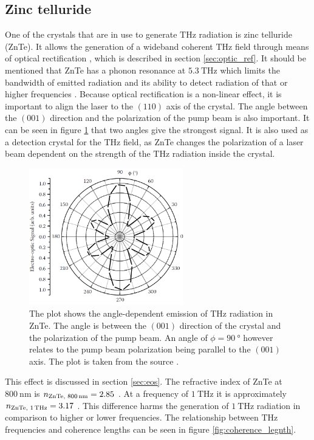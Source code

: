 \subsection{Zinc telluride}
\label{sec:znte}
One of the crystals that are in use to generate $\si{\tera\hertz}$ radiation is zinc telluride (ZnTe). 
It allows the generation of a wideband coherent $\si{\tera\hertz}$ field through means of optical rectification \cite{ZnTe_Nahata_Weling_1996}, which is described in section \ref{sec:optic_ref}.
It should be mentioned that ZnTe has a phonon resonance at $\SI{5.3}{\tera\hertz}$ which limits the bandwidth of emitted radiation and its ability to detect radiation of that or higher frequencies \cite{phonon_modes}\cite{phonon_ZnTe}.
Because optical rectification is a non-linear effect, it is important to align the laser to the $(110)$ axis of the crystal.
The angle between the $(001)$ direction and the polarization of the pump beam is also important.
It can be seen in figure \ref{fig:polarization_dependence_angle} that two angles give the strongest signal.
It is also used as a detection crystal for the $\si{\tera\hertz}$ field, as ZnTe changes the polarization of a laser beam dependent on the strength of the $\si{\tera\hertz}$ radiation inside the crystal.\FloatBarrier
\begin{figure}
    \centering
    \includegraphics[width=0.6\textwidth]{refferenced_pic/degreedepenceZnTe.png}
    \caption{The plot shows the angle-dependent emission of $\si{\tera\hertz}$ radiation in ZnTe.
    The angle is between the $(001)$ direction of the crystal and the polarization of the pump beam. An angle of $\phi = \SI{90}{\degree}$ however relates to the pump beam polarization being parallel to the $(001)$ axis.
    The plot is taken from the source \cite{selig}.}
    \label{fig:polarization_dependence_angle}
\end{figure} \FloatBarrier
This effect is discussed in section \ref{sec:eos}.
The refractive index of ZnTe at $\SI{800}{\nano\meter}$ is $n_\text{ZnTe, 800\,nm} = 2.85$ \cite{refractive_index_znte}.
At a frequency of $\SI{1}{\tera\hertz}$ it is approximately  $n_\text{ZnTe, 1\,THz} = 3.17$ \cite{hebling2004tunable}.
This difference harms the generation of $\SI{1}{\tera\hertz}$ radiation in comparison to higher or lower frequencies.
The relationship between $\si{\tera\hertz}$ frequencies and coherence lengths can be seen in figure \ref{fig:coherence_legnth}.
